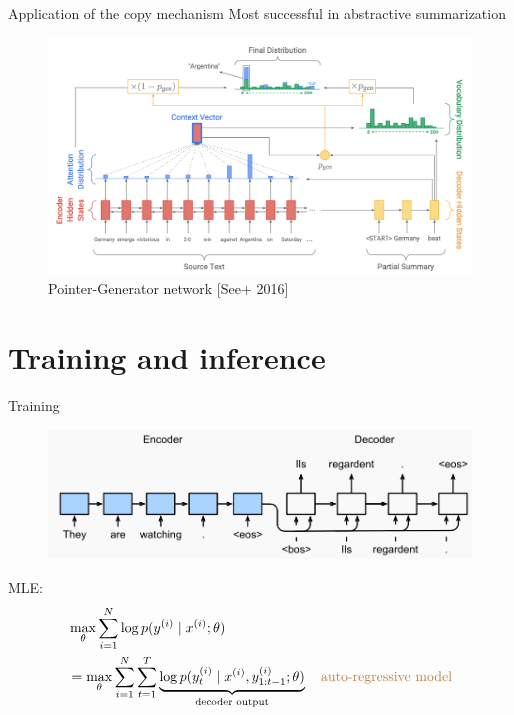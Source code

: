 \documentclass[usenames,dvipsnames,11pt,aspectratio=169]{beamer}
\begin{document}
\begin{frame}
    {Application of the copy mechanism}
    Most successful in abstractive summarization
    \vspace{-1em}
    \begin{figure}
        \includegraphics[width=12cm]{figures/pg}
        \caption{Pointer-Generator network [See+ 2016]}
    \end{figure}
\end{frame}

\section{Training and inference}

\begin{frame}
    {Training}
    \begin{figure}
        \includegraphics[width=12cm]{figures/s2s-training}
    \end{figure}
    MLE:
    \begin{align*}
        & \max_{\theta} \sum_{i=1}^N \log p(y^{(i)}\mid x^{(i)}; \theta) \\
        &= \max_{\theta} \sum_{i=1}^N \sum_{t=1}^T \underbrace{\log p(y^{(i)}_t \mid x^{(i)}, y^{(i)}_{1:t-1}; \theta)}_{\text{decoder output}} \quad \text{\textcolor{brown}{auto-regressive model}}
    \end{align*}
\end{frame}
\end{document}
